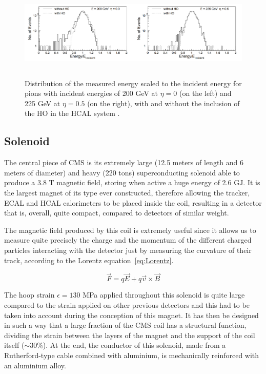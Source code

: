 \documentclass[a4paper, 10pt, openright]{report}
\begin{document}
\begin{figure}[htbp]
\begin{center}
\includegraphics[width=13cm, height=4.5cm]{figs/HOImpact.png}
\caption{Distribution of the measured energy scaled to the incident energy for pions with incident energies of 200 GeV at $\eta = 0$ (on the left) and 225 GeV at $\eta = 0.5$ (on the right), with and without the inclusion of the \ac{HO} in the \ac{HCAL} system \cite{CMSDescription}.}
\label{fig:HOImpact}
\end{center}
\end{figure}

\subsection{Solenoid} \label{subsection:Solenoid}

The central piece of \ac{CMS} is its extremely large (12.5 meters of length and 6 meters of diameter) and heavy (220 tons) superconducting solenoid able to produce a 3.8 T magnetic field, storing when active a huge energy of 2.6 GJ. It is the largest magnet of its type ever constructed, therefore allowing the tracker, \ac{ECAL} and \ac{HCAL} calorimeters to be placed inside the coil, resulting in a detector that is, overall, quite compact, compared to detectors of similar weight.

The magnetic field produced by this coil is extremely useful since it allows us to measure quite precisely the charge and the momentum of the different charged particles interacting with the detector just by measuring the curvature of their track, according to the Lorentz equation~\ref{eq:Lorentz}.

\begin{equation}
\label{eq:Lorentz}
\overrightarrow{F} = q \overrightarrow{E} + q \overrightarrow{v} \times \overrightarrow{B}
\end{equation}

The hoop strain $\epsilon = 130$ MPa applied throughout this solenoid is quite large compared to the strain applied on other previous detectors and this had to be taken into account during the conception of this magnet. It has then be designed in such a way that a large fraction of the \ac{CMS} coil has a structural function, dividing the strain between the layers of the magnet and the support of the coil itself ($\sim 30$\%). At the end, the conductor of this solenoid, made from a Rutherford-type cable combined with aluminium, is mechanically reinforced with an aluminium alloy.
\end{document}
